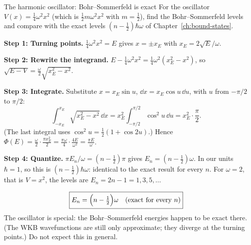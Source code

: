 \begin{sample}{The harmonic oscillator: Bohr--Sommerfeld is exact}
For the oscillator $V(x)=\frac14\omega^2x^2$ (which is $\frac12m\omega^2x^2$ with $m=\frac12$), find the Bohr--Sommerfeld levels and compare with the exact levels $(n-\frac12)\hbar\omega$ of Chapter~\ref{ch:bound-states}.

\textbf{Step 1: Turning points.} $\frac14\omega^2x^2=E$ gives $x=\pm x_E$ with $x_E=2\sqrt E/\omega$.

\textbf{Step 2: Rewrite the integrand.} $E-\frac14\omega^2x^2=\frac14\omega^2(x_E^2-x^2)$, so $\sqrt{E-V}=\frac\omega2\sqrt{x_E^2-x^2}$.

\textbf{Step 3: Integrate.} Substitute $x=x_E\sin u$, $\dd x=x_E\cos u\,\dd u$, with $u$ from $-\pi/2$ to $\pi/2$:
\[
\int_{-x_E}^{x_E}\sqrt{x_E^2-x^2}\,\dd x=x_E^2\int_{-\pi/2}^{\pi/2}\cos^2u\,\dd u=x_E^2\cdot\frac\pi2 .
\]
(The last integral uses $\cos^2u=\frac12(1+\cos2u)$.) Hence $\Phi(E)=\frac\omega2\cdot\frac{\pi x_E^2}{2}=\frac{\pi\omega}{4}\cdot\frac{4E}{\omega^2}=\frac{\pi E}{\omega}$.

\textbf{Step 4: Quantize.} $\pi E_n/\omega=(n-\frac12)\pi$ gives $E_n=(n-\frac12)\omega$. In our units $\hbar=1$, so this is $(n-\frac12)\hbar\omega$: identical to the exact result for every $n$. For $\omega=2$, that is $V=x^2$, the levels are $E_n=2n-1=1,3,5,\dots$

\[
\boxed{E_n=\Bigl(n-\tfrac12\Bigr)\omega\quad\text{(exact for every }n)}
\]
The oscillator is special: the Bohr--Sommerfeld energies happen to be exact there. (The WKB wavefunctions are still only approximate; they diverge at the turning points.) Do not expect this in general.
\end{sample}

